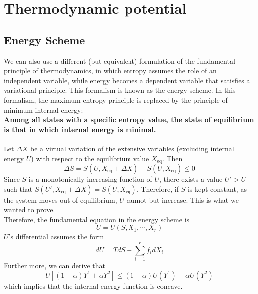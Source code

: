 \documentclass[cyan]{elegantnote}
\begin{document}
\section{Thermodynamic potential}
\subsection{Energy Scheme}
We can also use a different (but equivalent) formulation of the fundamental principle of thermodynamics, in which entropy assumes the role of an independent variable, while energy becomes a dependent variable that satisfies a variational principle. This formalism is known as the energy scheme. In this formalism, the maximum entropy principle is replaced by the principle of minimum internal energy:
\\ 
\textbf{Among all states with a specific entropy value, the state of equilibrium is that in which internal energy is minimal.}
\\ \\
Let $\Delta X$ be a virtual variation of the extensive variables (excluding internal energy $U$) with respect to the equilibrium value $X_{\mathrm{eq}}$. Then
\[\Delta S = S(U,X_{\mathrm{eq}} + \Delta X) - S(U,X_{\mathrm{eq}} ) \leq 0\]
Since $S$ is a monotonically increasing function of $U$, there exists a value $U' > U$ such that $S(U',X_{\mathrm{eq}} + \Delta X) = S(U, X_{\mathrm{eq}})$. Therefore, if $S$ is kept constant, as the system moves out of equilibrium, $U$ cannot but increase. This is what we wanted to prove.
\\
Therefore, the fundamental equation in the energy scheme is
\[U = U(S,X_1,\cdots,X_r)\]
$U$'s differential assumes the form
\[dU = TdS + \sum_{i=1}^r f_i dX_i\]
Further more, we can derive that
\[ U[(1-\alpha)Y^1 + \alpha Y^2] \leq (1 - \alpha)U(Y^1) + \alpha U(Y^2) \]
which implies that the internal energy function is concave.
\end{document}
